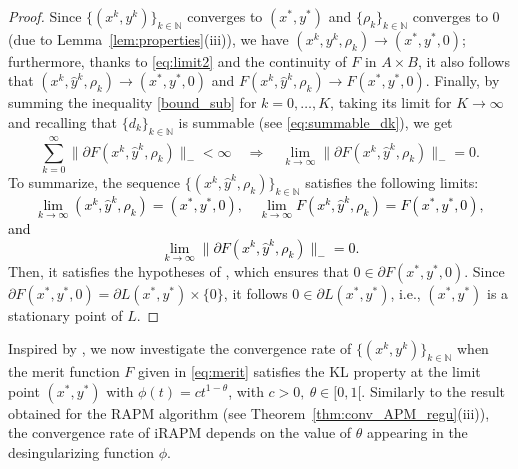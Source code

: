 \documentclass[pdflatex,sn-mathphys-num]{sn-jnl}
\numberwithin{equation}{section}%
\def\N{\mathbb{N}}
\newcommand{\ste}[1]{\textcolor{black}{#1}}
\theoremstyle{thmstyleone}%
\theoremstyle{thmstyletwo}%
\theoremstyle{thmstylethree}%
\begin{document}
\begin{proof}
Since $\{(x^k,y^k)\}_{k\in\N}$ converges to $(x^*,y^*)$ and $\{\rho_k\}_{k\in\N}$ converges to $0$ (due to Lemma~\ref{lem:properties}(iii)), we have $(x^k,y^k,\rho_k)\rightarrow (x^*,y^*,0)$; furthermore, thanks to \eqref{eq:limit2} and the continuity of $F$ in $A\times B$, it also follows that $(x^k,\hat{y}^k,\rho_k)\rightarrow (x^*,y^*,0)$ and $F(x^k,\hat{y}^k,\rho_k)\rightarrow F(x^*,y^*,0)$. Finally, by summing the inequality  \eqref{bound_sub} for $k=0,\ldots,K$, taking its limit for $K\rightarrow \infty$ and recalling that $\{d_k\}_{k\in\N}$ is summable (see \eqref{eq:summable_dk}), we get
\begin{equation*}
    \sum_{k=0}^\infty\|\partial F(x^k,\hat{y}^k,\rho_k)\|_{-}<\infty \quad \Rightarrow \quad \lim_{k\rightarrow \infty}\|\partial F(x^k,\hat{y}^k,\rho_k)\|_{-}=0.
\end{equation*}
To summarize, the sequence $\{(x^k,\hat{y}^k,\rho_k)\}_{k\in\N}$ satisfies the following limits:
\ste{\begin{equation*}
    \lim_{k\rightarrow \infty}(x^k,\hat{y}^k,\rho_k)= (x^*,y^*,0), \quad \lim_{k\rightarrow \infty}F(x^k,\hat{y}^k,\rho_k)= F(x^*,y^*,0),
    \end{equation*}
    and 
    \begin{equation*}
 \lim_{k\rightarrow \infty}\|\partial F(x^k,\hat{y}^k,\rho_k)\|_{-}=0.
\end{equation*}}
Then, it satisfies the hypotheses of \cite[Lemma 2.1]{Frankel-etal-2015}, which ensures that $0\in \partial F(x^*,y^*,0)$. Since $\partial F(x^*,y^*,0)=\partial L(x^*,y^*)\times \{0\}$, it follows  $0\in\partial L(x^*,y^*)$, i.e., $(x^*,y^*)$ is a stationary point of $L$.
\end{proof}

Inspired by \cite{attouch20009proximal}, we now investigate the convergence rate of $\{(x^k,y^k)\}_{k\in\N}$ when the merit function $F$ given in \eqref{eq:merit} satisfies the KL property at the limit point $(x^*,y^*)$ with $\phi(t)=ct^{1-\theta}$, with $c>0, \ \theta\in [0,1[$. {Similarly to the result obtained for the RAPM algorithm (see Theorem~\ref{thm:conv_APM_regu}(iii)), the convergence rate of iRAPM depends on the value of $\theta$ appearing in the desingularizing function $\phi$.
}
\end{document}
